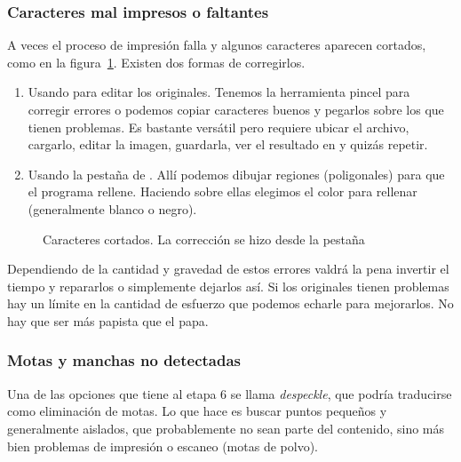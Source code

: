 \documentclass[%
	a5paper,
	10pt,
	twoside,
	openright,
	final,
]{memoir}
\begin{document}
{	\subsubsection{Caracteres mal impresos o faltantes} A veces el proceso de impresión falla y algunos caracteres aparecen cortados, como en la figura~\ref{fig:SToutputBadChars}. Existen dos formas de corregirlos.
	\begin{enumerate}
		\item Usando \gimp para editar los originales. Tenemos la herramienta pincel para corregir errores o podemos copiar caracteres buenos y pegarlos sobre los que tienen problemas. Es bastante versátil pero requiere ubicar el archivo, cargarlo, editar la imagen, guardarla, ver el resultado en \scantailor y quizás repetir. %
		\item Usando la pestaña  de \scantailor. Allí podemos dibujar regiones (poligonales) para que el programa rellene. Haciendo  sobre ellas elegimos el color para rellenar (generalmente blanco o negro).
	\end{enumerate}

	\begin{figure}
		\hfill
		\hfill
		\caption[Caracteres cortados]{Caracteres cortados. La corrección se hizo desde la pestaña \label{fig:SToutputBadChars}}
	\end{figure}

	Dependiendo de la cantidad y gravedad de estos errores valdrá la pena invertir el tiempo y repararlos o simplemente dejarlos así. %
	Si los originales tienen problemas hay un límite en la cantidad de esfuerzo que podemos echarle para mejorarlos. No hay que ser más papista que el papa. %

	\subsubsection{Motas y manchas no detectadas} Una de las opciones que tiene al etapa 6 se llama \emph{despeckle}, que podría traducirse como eliminación de motas. Lo que hace es buscar puntos pequeños y generalmente aislados, que probablemente no sean parte del contenido, sino más bien problemas de impresión o escaneo (motas de polvo).

}
\end{document}

